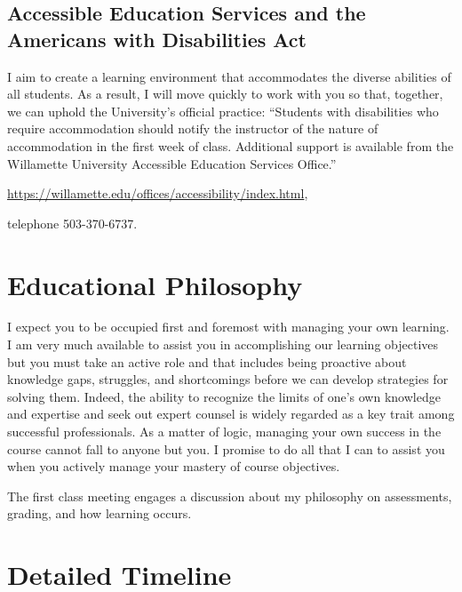 \documentclass[11pt,]{article}
\begin{document}
\subsection{Accessible Education Services and the Americans with
Disabilities
Act}\label{accessible-education-services-and-the-americans-with-disabilities-act}

I aim to create a learning environment that accommodates the diverse
abilities of all students. As a result, I will move quickly to work with
you so that, together, we can uphold the University's official practice:
``Students with disabilities who require accommodation should notify the
instructor of the nature of accommodation in the first week of class.
Additional support is available from the Willamette University
Accessible Education Services Office.''

\url{https://willamette.edu/offices/accessibility/index.html},

telephone 503-370-6737.

\section{Educational Philosophy}\label{educational-philosophy}

I expect you to be occupied first and foremost with managing your own
learning. I am very much available to assist you in accomplishing our
learning objectives but you must take an active role and that includes
being proactive about knowledge gaps, struggles, and shortcomings before
we can develop strategies for solving them. Indeed, the ability to
recognize the limits of one's own knowledge and expertise and seek out
expert counsel is widely regarded as a key trait among successful
professionals. As a matter of logic, managing your own success in the
course cannot fall to anyone but you. I promise to do all that I can to
assist you when you actively manage your mastery of course objectives.

The first class meeting engages a discussion about my philosophy on
assessments, grading, and how learning occurs.

\newpage

\section{Detailed Timeline}\label{detailed-timeline}
\end{document}
